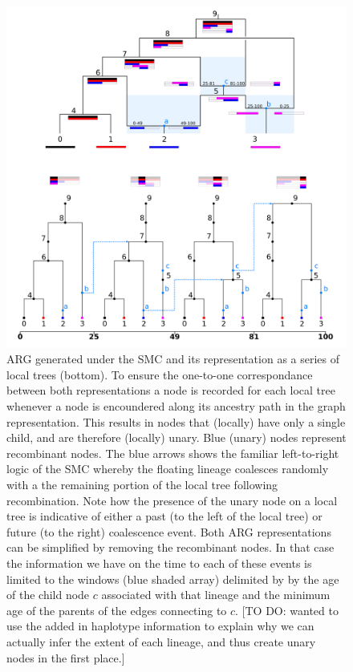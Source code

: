 \documentclass{article}
\begin{document}
\begin{figure}[!ht]
\centering
\includegraphics[width=\textwidth]{figures/smc_custom_2rows_area.png}
\caption{ARG generated under the SMC and its representation as a 
series of local trees (bottom). To ensure the one-to-one correspondance 
between both representations a node is recorded for each local tree whenever 
a node is encoundered along its ancestry path in the graph representation. 
This results in nodes that (locally) have only a single child, and are therefore 
(locally) unary. Blue (unary) nodes represent recombinant nodes. 
The blue arrows shows the familiar left-to-right logic of the SMC whereby 
the floating lineage coalesces randomly
with a the remaining portion of the local tree following recombination.
Note how the presence of the unary node on a local tree is 
indicative of either a past (to the left of the local tree) 
or future (to the right) coalescence event. 
Both ARG representations can be simplified by removing the recombinant nodes. 
In that case the information we have on the time to each of these events is 
limited to the windows (blue shaded array) delimited by by the age of 
the child node $c$ associated with that lineage and the minimum age of 
the parents of the edges connecting to $c$. 
 [TO DO: wanted to use the 
added in haplotype information to explain why we can actually infer the 
extent of each lineage, and thus create unary nodes in the first place.]
}
\label{fig:smc-unary}
\end{figure}
\end{document}

